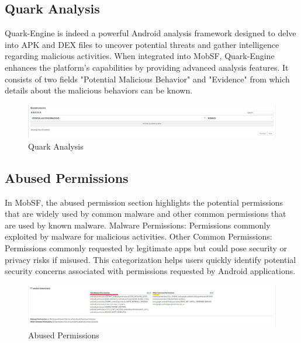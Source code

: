 \documentclass{report}
\begin{document}
\subsection{Quark Analysis}
Quark-Engine is indeed a powerful Android analysis framework designed to delve into APK and DEX files to uncover potential threats and gather intelligence regarding malicious activities. When integrated into MobSF, Quark-Engine enhances the platform's capabilities by providing advanced analysis features. It consists of two fields "Potential Malicious Behavior" and "Evidence" from which details about the malicious behaviors can be known.  

\begin{figure}[hbt!]
    \centering
    \includegraphics[width=1\textwidth]{images/quark.jpg}
    \caption{Quark Analysis}
    \label{fig:example}
\end{figure}
\FloatBarrier

\subsection{Abused Permissions}
In MobSF, the abused permission section highlights the potential permissions that are widely used by common malware and other common permissions that are used by known malware.\newline
Malware Permissions: Permissions commonly exploited by malware for malicious activities.\newline
Other Common Permissions: Permissions commonly requested by legitimate apps but could pose security or privacy risks if misused.\newline
This categorization helps users quickly identify potential security concerns associated with permissions requested by Android applications.
\begin{figure}[hbt!]
    \centering
    \includegraphics[width=1\textwidth]{images/abusedpermissions.jpg}
    \caption{Abused Permissions}
        \label{fig:example}
\end{figure}
\FloatBarrier
\end{document}
